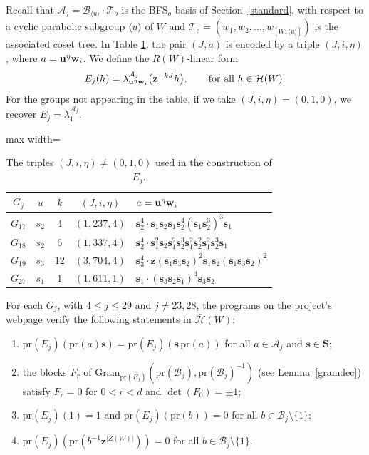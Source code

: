 \documentclass[11pt, reqno]{amsart}
\newcommand{\gram}{\mathrm{Gram}}
\newcommand{\cA}{\mathcal{A}}
\newcommand{\cB}{\mathcal{B}}
\newcommand{\cH}{\mathcal{H}}
\newcommand{\cT}{\mathcal{T}}
\newcommand{\bw}{\mathbf{w}}
\numberwithin{equation}{section}
\theoremstyle{remark}
\begin{document}
 Recall that $\mathcal A_j=\mathcal B_{\langle u \rangle}\cdot \cT_o$ is the
BFS$_o$ basis of Section~\ref{standard}, with respect to
a cyclic parabolic subgroup $\langle u \rangle$ of $W$ and $\cT_o=(w_1,w_2,\dots,w_{[W:\langle u \rangle]})$ is the associated
coset tree.
In Table \ref{tab:traces}, the pair $(J,a)$ is encoded by a triple $(J,i,\eta)$, where $a={\bf u}^{\eta}{\bw}_i$.
We define the $R(W)$-linear form
\[
E_j(h)=\lambda^{\mathcal A_j}_{{\bf u}^{\eta}{\bw}_i}\bigl(\mathbf z^{-kJ}h\bigr),\qquad \text{for all }h\in\mathcal H(W).
\]
For the groups not appearing in the table, if we take $(J,i,\eta)=(0,1,0)$, we recover $E_j=\lambda^{\mathcal A_j}_1$.
\begin{table}[H]
	\centering
	\renewcommand{\arraystretch}{1.3}
	\begin{adjustbox}{max width=\textwidth}
		\begin{tabular}{c|c|c|c|l}
			$G_j$ & $u$ & $k$ & $(J,i,\eta)$ & $a={\bf u}^{\eta}{\bw}_i$ \\
			\hline
			$G_{17}$ & $s_2$ & $4$ & $(1,237,4)$ &
			$\mathbf s_2^4\cdot \mathbf s_1\mathbf s_2\mathbf s_1\mathbf s_2^4(\mathbf s_1\mathbf s_2^3)^3\mathbf s_1$ \\
			$G_{18}$ & $s_2$ & $6$ & $(1,337,4)$ &
			$\mathbf s_2^4\cdot \mathbf s_1^2\mathbf s_2\mathbf s_1^2\mathbf s_2^3\mathbf s_1^2\mathbf s_2^2\mathbf s_1^2\mathbf s_2^3\mathbf s_1$ \\
			$G_{19}$ & $s_3$ & $12$ & $(3,704,4)$ &
			$\mathbf s_3^4\cdot \mathbf z(\mathbf s_1\mathbf s_3\mathbf s_2)^2\mathbf s_1\mathbf s_2(\mathbf s_1\mathbf s_3\mathbf s_2)^2$ \\
			$G_{27}$ & $s_1$ & $1$ & $(1,611,1)$ &
			$\mathbf s_1\cdot (\mathbf s_3\mathbf s_2\mathbf s_1)^4\mathbf s_3\mathbf s_2$
		\end{tabular}
	\end{adjustbox}
	\caption{The triples $(J,i,\eta) \neq (0,1,0)$ used in the construction of  $E_j$.}
	\label{tab:traces}
\end{table}




For each $G_j$, with $4\le j\le 29$ and $j\neq 23,28$, the programs on the project's webpage \cite{web} verify the following statements in $\bar{\cH}(W)$:
	\begin{enumerate}
		\item[(V1)] $\mathrm{pr}(E_j)(\mathrm{pr}(a)\mathbf s)=\mathrm{pr}(E_j)(\mathbf s\,\mathrm{pr}(a))$ for all $a\in\cA_j$ and $\mathbf s\in\mathbf S$; \smallbreak
		\item[(V2)] the blocks $F_r$ of $\gram_{\mathrm{pr}(E_j)}(\mathrm{pr}(\cB_j),\mathrm{pr}(\cB_j)^{-1})$ (see Lemma~\ref{gramdec})
		 satisfy $F_r=0$ for $0<r<d$ and $\det(F_0)=\pm1$;\smallbreak
		\item[(V3)] $\mathrm{pr}(E_j)(1)=1$ and $\mathrm{pr}(E_j)(\mathrm{pr}(b))=0$ for all $b\in\cB_j\setminus\{1\}$;\smallbreak
		\item[(V4)] $\mathrm{pr}(E_j)(\mathrm{pr}(b^{-1}\mathbf z^{|Z(W)|}))=0$ for all $b\in\cB_j\setminus\{1\}$.
	\end{enumerate}
\end{document}
